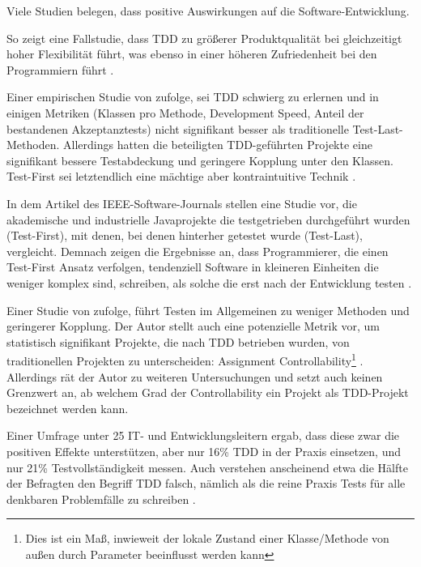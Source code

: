 Viele Studien belegen, dass  positive Auswirkungen auf die Software-Entwicklung.


So zeigt eine Fallstudie, dass TDD zu größerer Produktqualität bei gleichzeitigt hoher Flexibilität führt, was ebenso in einer höheren Zufriedenheit bei den Programmiern führt \citep{hans_wasmus_evaluation_2007}.


Einer empirischen Studie von \citeauthor{madeyski_test-driven_2009} zufolge, sei TDD schwierg zu erlernen und in einigen Metriken (Klassen pro Methode, Development Speed, Anteil der bestandenen Akzeptanztests) nicht signifikant besser als traditionelle Test-Last-Methoden. Allerdings hatten die beteiligten TDD-geführten Projekte eine signifikant bessere Testabdeckung und geringere Kopplung unter den Klassen. Test-First sei letztendlich eine mächtige aber kontraintuitive Technik \citep{madeyski_test-driven_2009}.


In dem Artikel des IEEE-Software-Journals stellen \citeauthor{janzen_does_2008} eine Studie vor, die akademische und industrielle Javaprojekte die testgetrieben durchgeführt wurden (Test-First), mit denen, bei denen hinterher getestet wurde (Test-Last), vergleicht. Demnach zeigen die Ergebnisse an, dass Programmierer, die einen Test-First Ansatz verfolgen, tendenziell Software in kleineren Einheiten die weniger komplex sind, schreiben, als solche die erst nach der Entwicklung testen \citep{janzen_does_2008}.

Einer Studie von \citeauthor{mueller_effect_2006} zufolge, führt Testen im Allgemeinen zu weniger Methoden und geringerer Kopplung. Der Autor stellt auch eine potenzielle Metrik vor, um statistisch signifikant Projekte, die nach TDD betrieben wurden, von traditionellen Projekten zu unterscheiden: Assignment Controllability\footnote{Dies ist ein Maß, inwieweit der lokale Zustand einer Klasse/Methode von außen durch Parameter beeinflusst werden kann} \citep{mueller_effect_2006}. Allerdings rät der Autor zu weiteren Untersuchungen und setzt auch keinen Grenzwert an, ab welchem Grad der Controllability ein Projekt als TDD-Projekt bezeichnet werden kann.

Einer Umfrage unter 25 IT- und Entwicklungsleitern ergab, dass diese zwar die positiven Effekte unterstützen, aber nur 16\% TDD in der Praxis einsetzen, und nur 21\% Testvollständigkeit messen. Auch verstehen anscheinend etwa die Hälfte der Befragten den Begriff TDD falsch, nämlich als die reine Praxis Tests für alle denkbaren Problemfälle zu schreiben \citep{stelligent_inc_stelligent_2007}.

